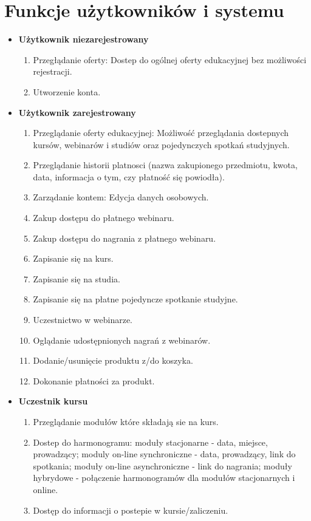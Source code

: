\documentclass[11pt]{article}
\begin{document}
\section{Funkcje użytkowników i systemu}
\label{sec:orgac5ae95}
\begin{itemize}
\item \textbf{Użytkownik niezarejestrowany}
\begin{enumerate}
\item Przegłądanie oferty: Dostep do ogólnej oferty edukacyjnej bez możliwości rejestracji.
\item Utworzenie konta.
\end{enumerate}
\item \textbf{Użytkownik zarejestrowany}
\begin{enumerate}
\item Przeglądanie oferty edukacyjnej: Możliwość przeglądania dostepnych kursów, webinarów i studiów oraz pojedynczych spotkań studyjnych.
\item Przeglądanie historii platnosci (nazwa zakupionego przedmiotu, kwota, data, informacja o tym, czy płatność się powiodła).
\item Zarządanie kontem: Edycja danych osobowych.
\item Zakup dostępu do płatnego webinaru.
\item Zakup dostępu do nagrania z płatnego webinaru.
\item Zapisanie się na kurs.
\item Zapisanie się na studia.
\item Zapisanie się na płatne pojedyncze spotkanie studyjne.
\item Uczestnictwo w webinarze.
\item Oglądanie udostępnionych nagrań z webinarów.
\item Dodanie/usunięcie produktu z/do koszyka.
\item Dokonanie płatności za produkt.
\end{enumerate}
\item \textbf{Uczestnik kursu}
\begin{enumerate}
\item Przeglądanie modułów które składają sie na kurs.
\item Dostep do harmonogramu: moduły stacjonarne - data, miejsce, prowadzący; moduly on-line synchroniczne - data, prowadzący, link do spotkania; moduły on-line asynchroniczne - link do nagrania; moduły hybrydowe - połączenie harmonogramów dla modułów stacjonarnych i online.
\item Dostęp do informacji o postepie w kursie/zaliczeniu.

\end{enumerate}
\end{itemize}
\end{document}
